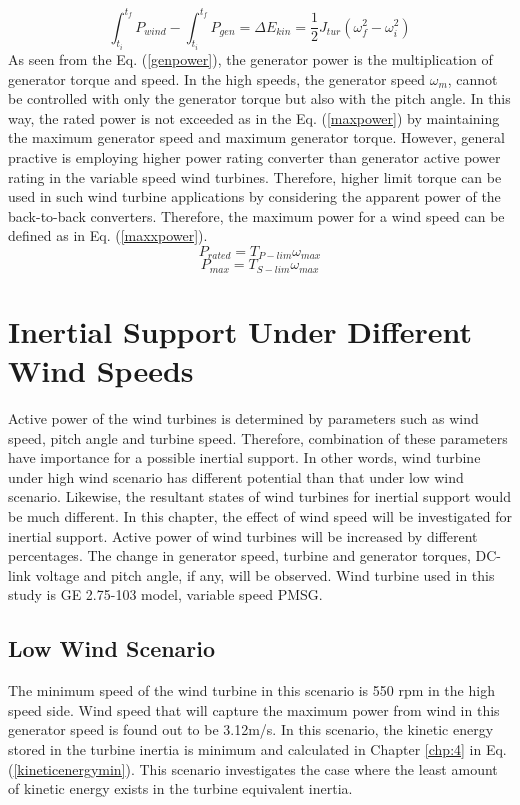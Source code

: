 \begin{equation}
 \int_{t_{i}}^{t_{f}}P_{wind}- \int_{t_{i}}^{t_{f}}P_{gen}=\Delta E_{kin}=\frac{1}{2}J_{tur}(\omega_{f}^2-\omega_{i}^2)
\label{finalspeed}
\end{equation}
As seen from the Eq. (\ref{genpower}), the generator power is the multiplication of generator torque and speed. In the high speeds, the generator speed $\omega_{m}$, cannot be controlled with only the generator torque but also with the pitch angle. In this way, the rated power is not exceeded as in the Eq. (\ref{maxpower}) by maintaining the maximum generator speed and maximum generator torque. However, general practive is employing higher power rating converter than generator active power rating in the variable speed wind turbines. Therefore, higher limit torque can be used in such wind turbine applications by considering the apparent power of the back-to-back converters. Therefore, the maximum power for a wind speed can be defined as in Eq. (\ref{maxxpower}).
\begin{equation}
P_{rated}=T_{P-lim} \omega_{max}
\label{maxpower}
\end{equation}
\begin{equation}
P_{max}=T_{S-lim} \omega_{max}
\label{maxxpower}
\end{equation}
\section{Inertial Support Under Different Wind Speeds}
Active power of the wind turbines is determined by parameters such as wind speed, pitch angle and turbine speed. Therefore, combination of these parameters have importance for a possible inertial support. In other words, wind turbine under high wind scenario has different potential than that under low wind scenario. Likewise, the resultant states of wind turbines for inertial support would be much different. In this chapter, the effect of wind speed will be investigated for inertial support. Active power of wind turbines will be increased by different percentages. The change in generator speed, turbine and generator torques, DC-link voltage and pitch angle, if any, will be observed. Wind turbine used in this study is GE 2.75-103 model, variable speed PMSG.
\subsection{Low Wind Scenario}
\label{sec:lowwind}
The minimum speed of the wind turbine in this scenario is 550 rpm in the high speed side. Wind speed that will capture the maximum power from wind in this generator speed is found out to be 3.12m/s. In this scenario, the kinetic energy stored in the turbine inertia is minimum and calculated in Chapter \ref{chp:4} in Eq. (\ref{kineticenergymin}). This scenario investigates the case where the least amount of kinetic energy exists in the turbine equivalent inertia.\par
